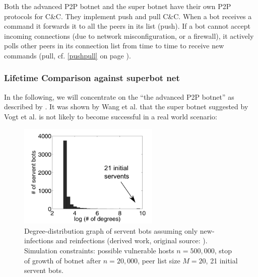 \documentclass{llncs}
\begin{document}
Both the advanced P2P botnet and the super botnet have their own P2P
protocols for C\&C. They implement push and pull
C\&C.\cite{wang2009systematic} When a bot receives a command it
forwards it to all the peers in its list (push). If a bot cannot
accept incoming connections (due to network misconfiguration, or a
firewall), it actively polls other peers in its connection list from
time to time to receive new commands (pull, cf. \ref{pushpull} on page
\pageref{pushpull}).

\subsubsection{Lifetime Comparison against superbot net}

In the following, we will concentrate on the ``the advanced P2P
botnet'' as described by \cite{td1sc}. It was shown by Wang et
al. \cite{td1sc} that the super botnet suggested by Vogt et al. is not
likely to become successful in a real world scenario:

\begin{figure}[htbp]
  \centering
  
    \includegraphics[width=0.6\textwidth]{figures/distributiongraph.png}
  
  \caption{Degree-distribution graph of servent bots assuming only new-infections and reinfections (derived work, original source: \cite{td1sc}). Simulation constraints: possible vulnerable hosts $n=500,000$, stop of growth of botnet after $n=20,000$, peer list size $M=20$, 21 initial servent bots.}
  \label{distributiongraph}
\end{figure}
\end{document}
